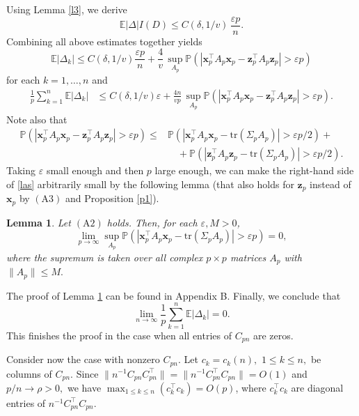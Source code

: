 \documentclass[12pt, a4paper]{article}
\newcommand\x{\mathbf x}
\newcommand\z{{\mathbf z}}
\newcommand\e{{\mathbb E}}
\newcommand\p{{\mathbb P}}
\newcommand\tr{{\mathrm{tr}}}
\newtheorem{lemma}[theorem]{Lemma}%
\begin{document}
Using Lemma \ref{l3}, we derive
\[\e|\Delta| I(D)\leqslant C(\delta,1/v)\,\frac{\varepsilon p}{n}.\]
Combining all above estimates together yields
\[ \e |\Delta_{k}| \leqslant C(\delta,1/v)\frac{\varepsilon p}{n}+ \frac 4v\,\sup_{ A_p}\p(|\x_p^\top  A_p \x_p-\z_p^\top  A_p \z_p|>\varepsilon  p)
\]
for each $k=1,\ldots,n$ and
\begin{align}\label{las} \frac1p\sum_{k=1}^n\e |\Delta_{k}| &\leqslant C(\delta,1/v)\varepsilon + \frac {4n}{vp}\,\sup_{ A_p}\p(|\x_p^\top  A_p \x_p-\z_p^\top  A_p \z_p|>\varepsilon  p).\end{align}
Note also that
\begin{align}\label{e106}\p(|\x_p^\top  A_p \x_p-\z_p^\top  A_p \z_p|>\varepsilon  p)\leqslant& \p(|\x_p^\top  A_p \x_p-\tr(\Sigma_pA_p)|>\varepsilon  p/2)+\nonumber\\&\quad+\p(|\z_p^\top  A_p \z_p -\tr(\Sigma_pA_p)|>\varepsilon  p/2).\end{align}
Taking $\varepsilon$ small enough and then $p$ large enough, we can make the right-hand side of \eqref{las}  arbitrarily small by the following lemma (that also holds for $\z_p$ instead of $\x_p$ by $(\mathrm A3)$ and Proposition \ref{p1}).
\begin{lemma} \label{l2} Let $(\mathrm A2)$ holds.  Then, for each $\varepsilon,M>0$,
\begin{equation}\label{limsup}
\lim_{p\to\infty}\sup_{A_p}\p(|\x_p^\top A_p \x_p-\tr(\Sigma_pA_p)|>\varepsilon p)=0,\end{equation}
where the supremum is taken over all complex $p\times p$ matrices $A_p$ with $\|A_p\|\leqslant M.$
\end{lemma}
The proof of Lemma \ref{l2} can be found in Appendix B. Finally, we conclude that 
\[\lim_{n\to\infty}\frac1p\sum_{k=1}^n\e  |\Delta_{k}| =0.\] 
This finishes the proof in the case when all entries of $C_{pn}$ are zeros.

Consider now the case with nonzero $C_{pn}$. Let $ c_k=c_k(n),$ $1\leqslant k\leqslant n,$ be columns of $C_{pn}$. Since $\|n^{-1}C_{pn}C_{pn}^\top\|=\|n^{-1}C_{pn}^\top C_{pn}\|=O(1)$  and $p/n\to\rho>0,$ we have $\max_{1\leqslant k\leqslant n}(c_k^\top c_k)=O(p)$, where $c_k^\top c_k$ are diagonal entries of $n^{-1}C_{pn}^\top C_{pn}$. 
\end{document}
